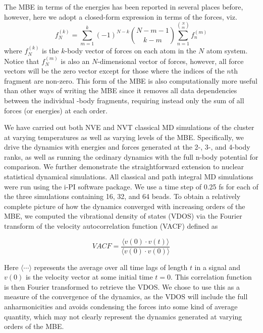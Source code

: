 \documentclass[11pt, proquest]{uwthesis}[2020/02/24]
\let\ce\ch
\begin{document}
\par The MBE in terms of the energies has been reported in several places before,\autocite{herbert_fantasy_2019,heindel_many-body_2020,xantheas_ab_1994} however, here we adopt a closed-form expression in terms of the forces,\autocite{lao_understanding_2016} viz.
\begin{equation}
    f_N^{(k)}=\sum_{m=1}^k(-1)^{N-k}\binom{N-m-1}{k-m}\sum_{n=1}^{\binom{N}{m}}f_n^{(m)}
\end{equation}
where $f_N^{(k)}$ is the $k$-body vector of forces on each atom in the $N$ atom system. Notice that $f_N^{(m)}$ is also an $N$-dimensional vector of forces, however, all force vectors will be the zero vector except for those where the indices of the $n$th fragment are non-zero. This form of the MBE is also computationally more useful than other ways of writing the MBE since it removes all data dependencies between the individual -body fragments, requiring instead only the sum of all forces (or energies) at each order.

\par We have carried out both NVE and NVT classical MD simulations of the \ce{(H2O)_{10}} cluster at varying temperatures as well as varying levels of the MBE. Specifically, we drive the dynamics with energies and forces generated at the 2-, 3-, and 4-body ranks, as well as running the ordinary dynamics with the full n-body potential for comparison. We further demonstrate the straightforward extension to nuclear statistical dynamical simulations. All classical and path integral MD simulations were run using the i-PI software package.\autocite{kapil_i-pi_2019} We use a time step of 0.25 fs for each of the three simulations containing 16, 32, and 64 beads.
To obtain a relatively complete picture of how the dynamics converged with increasing orders of the MBE, we computed the vibrational density of states (VDOS) via the Fourier transform of the velocity autocorrelation function (VACF) defined as

\begin{equation}
    VACF=\frac{\langle v(0)\cdot v(t)\rangle}{\langle v(0)\cdot v(0)\rangle}
\end{equation}

\par Here $\langle\cdots\rangle$ represents the average over all time lags of length $t$ in a signal and $v(0)$ is the velocity vector at some initial time $t=0$. This correlation function is then Fourier transformed to retrieve the VDOS. We chose to use this as a measure of the convergence of the dynamics, as the VDOS will include the full anharmonicities and avoids condensing the forces into some kind of average quantity, which may not clearly represent the dynamics generated at varying orders of the MBE.
\end{document}
